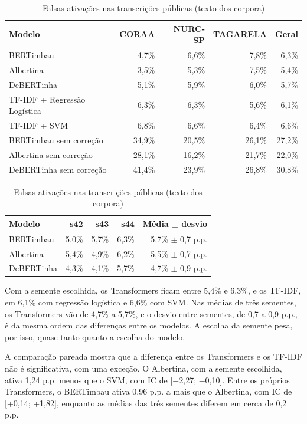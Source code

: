 \documentclass[
    12pt,                %
    openright,           %
    oneside,             %
    a4paper,             %
    english,             %
    brazil               %
]{abntex2}
\begin{document}
\begin{table}[htb]
\centering
\caption{Falsas ativações nas transcrições públicas (texto dos corpora)}
\label{tab:externa}
\small
\begin{tabular}{lrrrr}
\toprule
Modelo & CORAA & NURC-SP & TAGARELA & Geral \\
\midrule
BERTimbau & 4,7\% & 6,6\% & 7,8\% & 6,3\% \\
Albertina & 3,5\% & 5,3\% & 7,5\% & 5,4\% \\
DeBERTinha & 5,1\% & 5,9\% & 6,0\% & 5,7\% \\
TF-IDF + Regressão Logística & 6,3\% & 6,3\% & 5,6\% & 6,1\% \\
TF-IDF + SVM & 6,8\% & 6,6\% & 6,4\% & 6,6\% \\
BERTimbau sem correção & 34,9\% & 20,5\% & 26,1\% & 27,2\% \\
Albertina sem correção & 28,1\% & 16,2\% & 21,7\% & 22,0\% \\
DeBERTinha sem correção & 41,4\% & 23,9\% & 26,8\% & 30,8\% \\
\bottomrule
\end{tabular}
\par\vspace{8pt}
\begin{tabular}{lrrrr}
\toprule
Modelo & s42 & s43 & s44 & Média $\pm$ desvio \\
\midrule
BERTimbau & 5,0\% & 5,7\% & 6,3\% & 5,7\% $\pm$ 0,7 p.p. \\
Albertina & 5,4\% & 4,9\% & 6,2\% & 5,5\% $\pm$ 0,7 p.p. \\
DeBERTinha & 4,3\% & 4,1\% & 5,7\% & 4,7\% $\pm$ 0,9 p.p. \\
\bottomrule
\end{tabular}
\end{table}

Com a semente escolhida, os Transformers ficam entre 5,4\% e 6,3\%, e os TF-IDF, em 6,1\% com regressão logística e 6,6\% com SVM. Nas médias de três sementes, os Transformers vão de 4,7\% a 5,7\%, e o desvio entre sementes, de 0,7 a 0,9 p.p., é da mesma ordem das diferenças entre os modelos. A escolha da semente pesa, por isso, quase tanto quanto a escolha do modelo.

A comparação pareada mostra que a diferença entre os Transformers e os TF-IDF não é significativa, com uma exceção. O Albertina, com a semente escolhida, ativa 1,24 p.p. menos que o SVM, com IC de [$-$2,27; $-$0,10]. Entre os próprios Transformers, o BERTimbau ativa 0,96 p.p. a mais que o Albertina, com IC de [+0,14; +1,82], enquanto as médias das três sementes diferem em cerca de 0,2 p.p.
\end{document}
